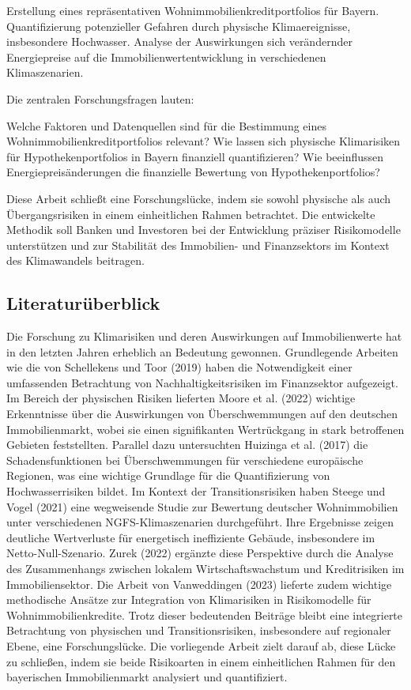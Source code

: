 Erstellung eines repräsentativen Wohnimmobilienkreditportfolios für Bayern.
Quantifizierung potenzieller Gefahren durch physische Klimaereignisse, insbesondere Hochwasser.
Analyse der Auswirkungen sich verändernder Energiepreise auf die Immobilienwertentwicklung in verschiedenen Klimaszenarien.

Die zentralen Forschungsfragen lauten:

Welche Faktoren und Datenquellen sind für die Bestimmung eines Wohnimmobilienkreditportfolios relevant?
Wie lassen sich physische Klimarisiken für Hypothekenportfolios in Bayern finanziell quantifizieren?
Wie beeinflussen Energiepreisänderungen die finanzielle Bewertung von Hypothekenportfolios?

Diese Arbeit schließt eine Forschungslücke, indem sie sowohl physische als auch Übergangsrisiken in einem einheitlichen Rahmen betrachtet. Die entwickelte Methodik soll Banken und Investoren bei der Entwicklung präziser Risikomodelle unterstützen und zur Stabilität des Immobilien- und Finanzsektors im Kontext des Klimawandels beitragen.
\subsection{Literaturüberblick }
Die Forschung zu Klimarisiken und deren Auswirkungen auf Immobilienwerte hat in den letzten Jahren erheblich an Bedeutung gewonnen. Grundlegende Arbeiten wie die von Schellekens und Toor (2019) haben die Notwendigkeit einer umfassenden Betrachtung von Nachhaltigkeitsrisiken im Finanzsektor aufgezeigt. Im Bereich der physischen Risiken lieferten Moore et al. (2022) wichtige Erkenntnisse über die Auswirkungen von Überschwemmungen auf den deutschen Immobilienmarkt, wobei sie einen signifikanten Wertrückgang in stark betroffenen Gebieten feststellten. Parallel dazu untersuchten Huizinga et al. (2017) die Schadensfunktionen bei Überschwemmungen für verschiedene europäische Regionen, was eine wichtige Grundlage für die Quantifizierung von Hochwasserrisiken bildet. Im Kontext der Transitionsrisiken haben Steege und Vogel (2021) eine wegweisende Studie zur Bewertung deutscher Wohnimmobilien unter verschiedenen NGFS-Klimaszenarien durchgeführt. Ihre Ergebnisse zeigen deutliche Wertverluste für energetisch ineffiziente Gebäude, insbesondere im Netto-Null-Szenario. Zurek (2022) ergänzte diese Perspektive durch die Analyse des Zusammenhangs zwischen lokalem Wirtschaftswachstum und Kreditrisiken im Immobiliensektor. Die Arbeit von Vanweddingen (2023) lieferte zudem wichtige methodische Ansätze zur Integration von Klimarisiken in Risikomodelle für Wohnimmobilienkredite. Trotz dieser bedeutenden Beiträge bleibt eine integrierte Betrachtung von physischen und Transitionsrisiken, insbesondere auf regionaler Ebene, eine Forschungslücke. Die vorliegende Arbeit zielt darauf ab, diese Lücke zu schließen, indem sie beide Risikoarten in einem einheitlichen Rahmen für den bayerischen Immobilienmarkt analysiert und quantifiziert.
